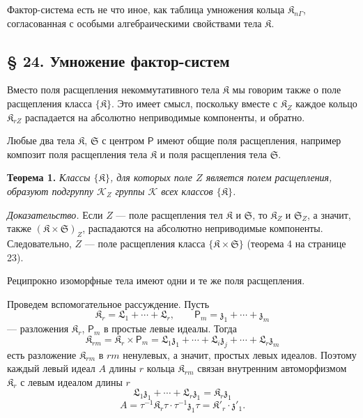 \documentclass[11pt]{article}
\begin{document}
Фактор-система есть не что иное, как таблица умножения кольца \(\mathfrak K_{n\Gamma}\), согласованная с особыми алгебраическими свойствами тела \(\mathfrak K\).

\subsection*{§ 24. Умножение фактор-систем}\label{multiplikation-von-faktorensystemen}

Вместо поля расщепления некоммутативного тела \(\mathfrak K\) мы говорим также о поле расщепления класса \(\{\mathfrak K\}\). Это имеет смысл, поскольку вместе с \(\mathfrak K_Z\) каждое кольцо \(\mathfrak K_{rZ}\) распадается на абсолютно неприводимые компоненты, и обратно.

Любые два тела \(\mathfrak K\), \(\mathfrak S\) с центром \(\mathsf P\) имеют общие поля расщепления, например композит поля расщепления тела \(\mathfrak K\) и поля расщепления тела \(\mathfrak S\).

\textbf{Теорема 1.} \emph{Классы \(\{\mathfrak K\}\), для которых поле \(Z\) является полем расщепления, образуют подгруппу \(\mathscr K_Z\) группы \(\mathscr K\) всех классов \(\{\mathfrak K\}\).}

\emph{Доказательство.} Если \(Z\) --- поле расщепления тел \(\mathfrak K\) и \(\mathfrak S\), то \(\mathfrak K_Z\) и \(\mathfrak S_Z\), а значит, также \((\mathfrak K\times\mathfrak S)_Z\), распадаются на абсолютно неприводимые компоненты. Следовательно, \(Z\) --- поле расщепления класса \(\{\mathfrak K\times\mathfrak S\}\) (теорема 4 на странице 23).

Реципрокно изоморфные тела имеют одни и те же поля расщепления.

Проведем вспомогательное рассуждение. Пусть
\[
\mathfrak K_r=\mathfrak L_1+\cdots+\mathfrak L_r,\qquad
\mathsf P_m=\mathfrak z_1+\cdots+\mathfrak z_m
\]
--- разложения \(\mathfrak K_r\), \(\mathsf P_m\) в простые левые идеалы. Тогда
\[
\mathfrak K_{rm}=\mathfrak K_r\times\mathsf P_m
=\mathfrak L_1\mathfrak z_1+\cdots+\mathfrak L_i\mathfrak z_j+\cdots+\mathfrak L_r\mathfrak z_m
\]
есть разложение \(\mathfrak K_{rm}\) в \(rm\) ненулевых, а значит, простых левых идеалов. Поэтому каждый левый идеал \(A\) длины \(r\) кольца \(\mathfrak K_{rm}\) связан внутренним автоморфизмом \(\mathfrak K_r\) с левым идеалом длины \(r\)
\[
\mathfrak L_1\mathfrak z_1+\cdots+\mathfrak L_r\mathfrak z_1=\mathfrak K_r\mathfrak z_1
\]
\[
A=\tau^{-1}\mathfrak K_r\tau\cdot\tau^{-1}\mathfrak z_1\tau
=\mathfrak K'_r\cdot\mathfrak z'_1.
\]
\end{document}
